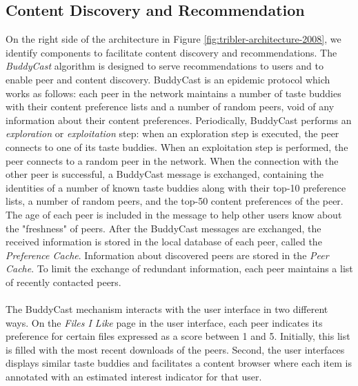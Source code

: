 \subsection{Content Discovery and Recommendation}
On the right side of the architecture in Figure \ref{fig:tribler-architecture-2008}, we identify components to facilitate content discovery and recommendations. The \emph{BuddyCast} algorithm is designed to serve recommendations to users and to enable peer and content discovery. BuddyCast is an epidemic protocol which works as follows: each peer in the network maintains a number of taste buddies with their content preference lists and a number of random peers, void of any information about their content preferences. Periodically, BuddyCast performs an \emph{exploration} or \emph{exploitation} step: when an exploration step is executed, the peer connects to one of its taste buddies. When an exploitation step is performed, the peer connects to a random peer in the network. When the connection with the other peer is successful, a BuddyCast message is exchanged, containing the identities of a number of known taste buddies along with their top-10 preference lists, a number of random peers, and the top-50 content preferences of the peer. The age of each peer is included in the message to help other users know about the "freshness" of peers. After the BuddyCast messages are exchanged, the received information is stored in the local database of each peer, called the \emph{Preference Cache}. Information about discovered peers are stored in the \emph{Peer Cache}. To limit the exchange of redundant information, each peer maintains a list of recently contacted peers.\\\\
The BuddyCast mechanism interacts with the user interface in two different ways. On the \emph{Files I Like} page in the user interface, each peer indicates its preference for certain files expressed as a score between 1 and 5. Initially, this list is filled with the most recent downloads of the peers. Second, the user interfaces displays similar taste buddies and facilitates a content browser where each item is annotated with an estimated interest indicator for that user.

